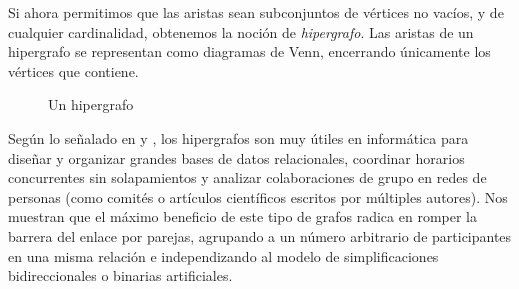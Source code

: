 Si ahora permitimos que las aristas sean subconjuntos de vértices no vacíos, y de cualquier cardinalidad, obtenemos la noción de \textit{hipergrafo}. Las aristas de un hipergrafo se representan como diagramas de Venn, encerrando únicamente los vértices que contiene.
\begin{figure}[H]
  \centering
    \resizebox{0.6\textwidth}{!}{} 
  \caption{Un hipergrafo}
\end{figure}
Según lo señalado en \cite{Bretto2013} y \cite{Molnar2014}, los hipergrafos son muy útiles en informática para diseñar y organizar grandes bases de datos relacionales, coordinar horarios concurrentes sin solapamientos y analizar colaboraciones de grupo en redes de personas (como comités o artículos científicos escritos por múltiples autores). Nos muestran que el máximo beneficio de este tipo de grafos radica en romper la barrera del enlace por parejas, agrupando a un número arbitrario de participantes en una misma relación e independizando al modelo de simplificaciones bidireccionales o binarias artificiales.
